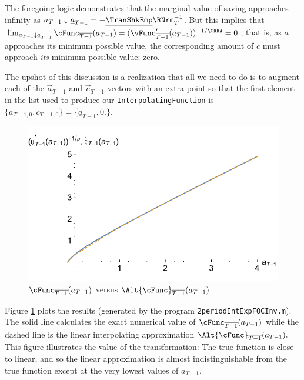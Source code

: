 \documentclass[titlepage, headings=optiontotocandhead]{\econtex}
\begin{document}
The foregoing logic demonstrates that the marginal value of saving approaches infinity as ${a}_{T-1} \downarrow
\underline{a}_{T-1}=-\underline{\TranShkEmp}\RNrm_{T}^{-1}$.  But this
implies that $\lim_{{a}_{T-1} \downarrow \underline{a}_{T-1}}
\cFunc_{\overline{T-1}}({a}_{T-1}) = (\vFunc^{\prime}_{\overline{T-1}}({a}_{T-1}))^{-1/\CRRA} = 0$;
that is, as ${a}$ approaches its minimum possible value, the
corresponding amount of ${c}$ must approach \textit{its} minimum possible value: zero.

The upshot of this discussion is a realization that all we need to do is to
augment each of the $\vec{a}_{T-1}$ and $\vec{c}_{T-1}$ vectors with an extra point so that the
first element in the list used to produce our \texttt{InterpolatingFunction} is
$\{{a}_{T-1,0},{c}_{T-1,0}\}=\{\underline{a}_{T-1},0.\}$.

\hypertarget{GothVInvVSGothC}{}
\begin{figure}
  \includegraphics{./Figures/GothVInvVSGothC}
  \caption{$\cFunc_{\overline{T-1}}({a}_{T-1})$ versus $\Alt{\cFunc}_{\overline{T-1}}({a}_{T-1})$}
  \label{fig:GothVInvVSGothC}
\end{figure}



Figure \ref{fig:GothVInvVSGothC} plots the results (generated by the program \texttt{2periodIntExpFOCInv.m}).  The solid line calculates the exact numerical value of $\cFunc_{\overline{T-1}}({a}_{T-1})$ while the dashed line is the linear interpolating approximation $\Alt{\cFunc}_{\overline{T-1}}({a}_{T-1}).$ This figure illustrates the value of the transformation: The true function is close to linear, and so the linear approximation is almost indistinguishable from the true function except at the very lowest values of ${a}_{T-1}$.
\end{document}
